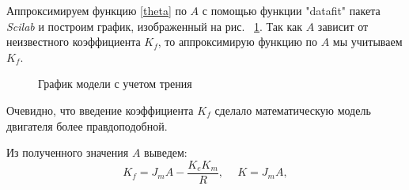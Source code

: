 Аппроксимируем функцию \eqref{theta} по $A$ с помощью функции "datafit" пакета \textit{Scilab} и построим график, изображенный на рис.~ \ref{yesfr}. Так как $A$ зависит от неизвестного коэффициента $K_f$, то аппроксимирую функцию по $A$ мы учитываем $K_f$. %

\begin{figure}[h]
	\noindent{}
	\caption{График модели с учетом трения}
	\label{yesfr}
\end{figure}

Очевидно, что введение коэффициента $K_f$ сделало математическую модель двигателя более правдоподобной.

Из полученного значения $A$ выведем:
\begin{equation}
	K_f = J_mA-\frac{K_eK_m}{R}, \phantom{-} K=J_mA,
\end{equation}

